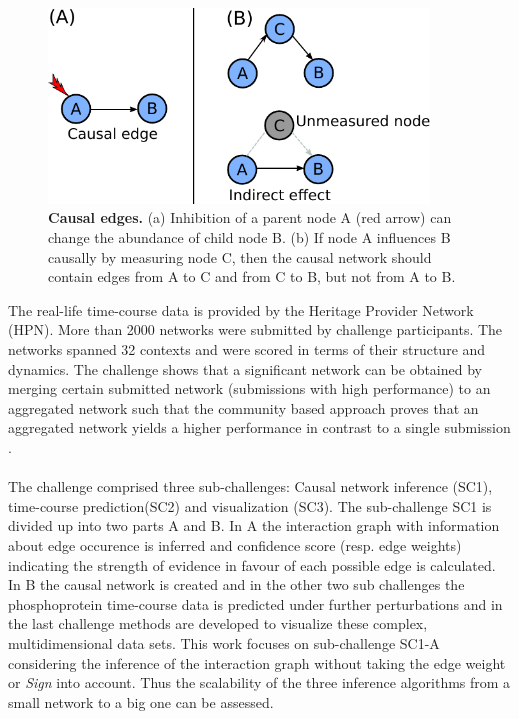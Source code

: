 \begin{figure}
\begin{minipage}{0.5\linewidth}
\includegraphics[width=0.9\textwidth]{./Bilder/causaledges.pdf}
\end{minipage}
\caption[Causal edges]{\textbf{Causal edges.} (a) Inhibition of a parent node A (red arrow) can change the abundance of child node B. (b) If node A influences B causally by measuring node C, then the causal network should contain edges from A to C and from C to B, but not from A to B. }
\label{fig:7}
\end{figure}




The real-life time-course data is provided by the Heritage Provider Network (HPN). More than 2000 networks were submitted by challenge participants. The networks spanned 32 contexts and were scored in terms of their structure and dynamics. 
The challenge shows that a significant network can be obtained by merging certain submitted network (submissions with high performance) to an aggregated network such that the community based approach proves that an aggregated network yields a higher performance in contrast to a single submission \citep{Hill.2016}.
\\\\
The challenge comprised three sub-challenges: Causal network inference (SC1), time-course prediction(SC2) and visualization (SC3).
The sub-challenge SC1 is divided up into two parts A and B. In A the interaction graph with information about edge occurence is inferred and confidence score (resp. edge weights) indicating the strength of evidence in favour of each possible edge is calculated. In B the causal network is created and in the other two sub challenges the phosphoprotein time-course data is predicted under further perturbations and in the last challenge methods are developed to visualize these complex, multidimensional data sets. This work focuses on sub-challenge SC1-A considering the inference of the interaction graph without taking the edge weight or \textit{Sign} into account. Thus the scalability of the three inference algorithms from a small network to a big one can be assessed.

